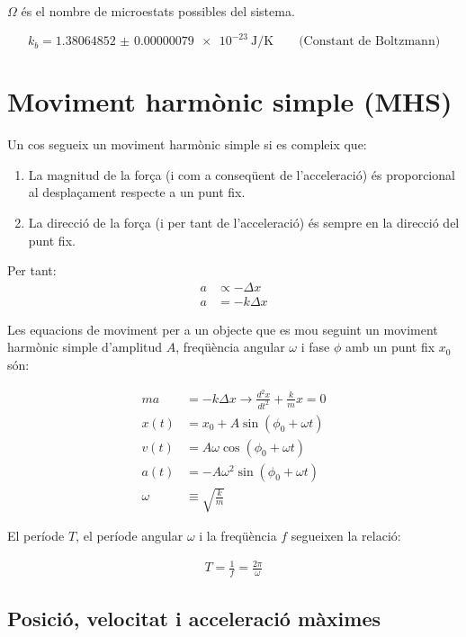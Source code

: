 $\Omega$ és el nombre de microestats possibles del sistema.

\begin{equation}
    k_b =  \SI{1.38064852(79)e-23}{\joule\per\kelvin} \qquad \text{(Constant de Boltzmann)}
\end{equation}

\section{Moviment harmònic simple (MHS)}
\label{sec:moviment_harmonic_simple}

Un cos segueix un moviment harmònic simple si es compleix que:
\begin{enumerate}
    \item La magnitud de la força (i com a conseqüent de l'acceleració)
        és proporcional al desplaçament respecte a un punt fix.
    \item La direcció de la força (i per tant de l'acceleració) és sempre en la
        direcció del punt fix.
\end{enumerate}
Per tant:
\begin{align}
    a &\propto -\Delta x\\
    a &= -k\Delta x
\end{align}

Les equacions de moviment per a un objecte que es mou seguint un moviment harmònic simple d'amplitud $A$, freqüència angular $\omega$ i fase $\phi$ amb un punt fix $x_0$són:

\begin{align}
    ma &= -k\Delta x \longrightarrow \frac{d^2x}{dt^2} + \frac{k}{m}x = 0 \nonumber \\
    x(t) &= x_0 + A\sin(\phi_0+\omega t) \\
    v(t) &= A\omega\cos(\phi_0+\omega t) \\
    a(t) &= -A\omega^2\sin(\phi_0+\omega t) \\
    \omega &\equiv \sqrt{\frac{k}{m}}
\end{align}

El període $T$, el període angular $\omega$ i la freqüència $f$ segueixen la
relació:

\begin{align}
    T = \frac{1}{f} = \frac{2\pi}{\omega}
\end{align}

\subsection{Posició, velocitat i acceleració màximes}
\label{sub:posicio_velocitat_i_acceleracio_maximes}


